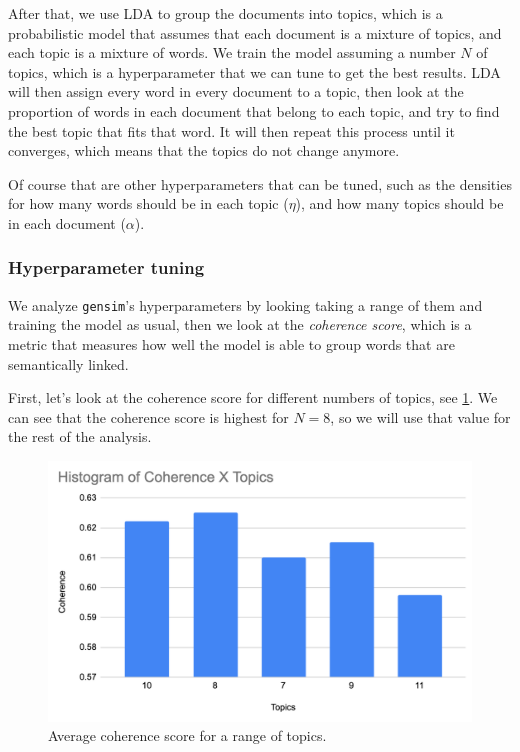 \documentclass[11pt, conference, onecolumn, final]{IEEEtran}
\begin{document}
After that, we use LDA to group the documents into topics, which is a
probabilistic model that assumes that each document is a mixture of topics, and
each topic is a mixture of words.
We train the model assuming a number $N$ of topics, which is a hyperparameter
that we can tune to get the best results. LDA will then assign every word in
every document to a topic, then look at the proportion of words in each
document that belong to each topic, and try to find the best topic that fits
that word.
It will then repeat this process until it converges, which means that the
topics do not change anymore.

Of course that are other hyperparameters that can be tuned, such as the
densities for how many words should be in each topic ($\eta$), and how many
topics should be in each document ($\alpha$).

\subsubsection{Hyperparameter tuning} \label{sec:methodology:statistics-hyper}

We analyze \verb|gensim|'s hyperparameters by looking taking a range of them
and training the model as usual, then we look at the \textit{coherence score},
which is a metric that measures how well the model is able to group words that
are semantically linked.

First, let's look at the coherence score for different numbers of topics, see
\cref{fig:coherenceXtopics}.
We can see that the coherence score is highest for $N = 8$, so we will use that
value for the rest of the analysis.

\begin{figure}[H]
    \centering
    \includegraphics[width=0.7\linewidth]{coherenceXtopics.png}
    \caption{Average coherence score for a range of topics.}
    \label{fig:coherenceXtopics}
\end{figure}
\end{document}
